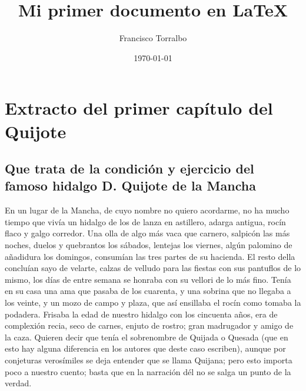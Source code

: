 \documentclass[a4paper, 12pt, twoside]{article} %
\title{Mi primer documento en \LaTeX}
\author{Francisco Torralbo}
\date{\today}
\begin{document}
\maketitle
\tableofcontents

\section{Extracto del primer capítulo del Quijote}

\subsection*{Que trata de la condición y ejercicio del famoso hidalgo D. Quijote de la Mancha}

En un lugar de la Mancha, de cuyo nombre no quiero acordarme, no ha mucho tiempo que vivía un hidalgo de los de lanza en astillero, adarga antigua, rocín flaco y galgo corredor. Una olla de algo más vaca que carnero, salpicón las más noches, duelos y quebrantos los sábados, lentejas los viernes, algún palomino de añadidura los domingos, consumían las tres partes de su hacienda. El resto della concluían sayo de velarte, calzas de velludo para las fiestas con sus pantuflos de lo mismo, los días de entre semana se honraba con su vellori de lo más fino. Tenía en su casa una ama que pasaba de los cuarenta, y una sobrina que no llegaba a los veinte, y un mozo de campo y plaza, que así ensillaba el rocín como tomaba la podadera. Frisaba la edad de nuestro hidalgo con los cincuenta años, era de complexión recia, seco de carnes, enjuto de rostro; gran madrugador y amigo de la caza. Quieren decir que tenía el sobrenombre de Quijada o Quesada (que en esto hay alguna diferencia en los autores que deste caso escriben), aunque por conjeturas verosímiles se deja entender que se llama Quijana; pero esto importa poco a nuestro cuento; basta que en la narración dél no se salga un punto de la verdad.
\end{document}

